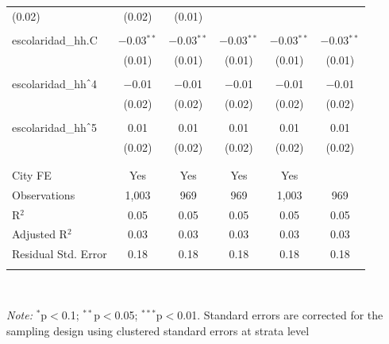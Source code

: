 \begin{table}[H]
\begin{tabularx}{0.9\textwidth}{@{\extracolsep{-7pt}}lccccc}
(0.02) & (0.02) & (0.01) \\    & & & & & \\   escolaridad\_hh.C & $-$0.03$^{**}$ & $-$0.03$^{**}$ & $-$0.03$^{**}$ & $-$0.03$^{**}$ & $-$0.03$^{**}$ \\    & (0.01) & (0.01) & (0.01) & (0.01) & (0.01) \\    & & & & & \\   escolaridad\_hh$\hat{\mkern6mu}$4 & $-$0.01 & $-$0.01 & $-$0.01 & $-$0.01 & $-$0.01 \\    & (0.02) & (0.02) & (0.02) & (0.02) & (0.02) \\    & & & & & \\   escolaridad\_hh$\hat{\mkern6mu}$5 & 0.01 & 0.01 & 0.01 & 0.01 & 0.01 \\    & (0.02) & (0.02) & (0.02) & (0.02) & (0.02) \\    & & & & & \\  \hline \\[-1.8ex]  City FE & Yes & Yes & Yes & Yes &  \\  Observations & 1,003 & 969 & 969 & 1,003 & 969 \\  R$^{2}$ & 0.05 & 0.05 & 0.05 & 0.05 & 0.05 \\  Adjusted R$^{2}$ & 0.03 & 0.03 & 0.03 & 0.03 & 0.03 \\  Residual Std. Error & 0.18 & 0.18 & 0.18 & 0.18 & 0.18 \\  \hline  \hline \\[-1.8ex]  \end{tabularx} \\ \parbox[]{\textwidth}{\textit{Note:} $^{*}$p$<$0.1; $^{**}$p$<$0.05; $^{***}$p$<$0.01. Standard errors are corrected for the sampling design using clustered standard errors at strata level }  \end{table} 